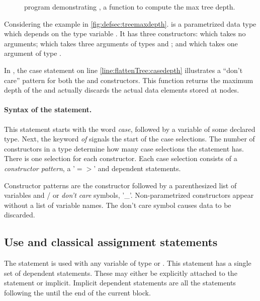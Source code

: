 \begin{figure}[htbp]
\begin{singlespace}

\end{singlespace}
\caption[Tree depth program to demonstrate ]{\lqpl{} program demonstrating , a function to compute the max tree depth.}
\label{fig:defsec:treemaxdepth}
\end{figure}

Considering the example in \vref{fig:defsec:treemaxdepth}. 
is a parametrized data type which depends on 
the type variable . It
 has three constructors:  which takes no arguments;
 which takes three arguments of types  and
; and  which takes one argument of type
.

In , the case statement on line
\ref{line:flattenTree:casedepth} illustrates a ``don't care'' pattern for
both the  and  constructors. This function
 returns the maximum depth of the  and actually
discards  the actual data elements stored at nodes.



\paragraph{Syntax of the  statement.} This statement
starts with the word \emph{case}, 
followed by a variable   of some declared type.
Next, the keyword \emph{of} signals the start of the case selections.
The number of constructors in a type determine how many 
case selections the statement has. There is one selection 
for each constructor.
Each case selection consists of  a \emph{constructor pattern}, a
'$=>$' and dependent statements. 

Constructor patterns 
are the constructor followed by a parenthesized list of 
variables and / or \emph{don't care} symbols, '\_'.  Non-parametrized 
constructors appear without a list of variable names. The 
don't care symbol causes data to be discarded.

\subsection{Use and classical assignment statements}\label{subsec:usestatements}

The  statement is used with any variable of type 
or . 
This statement  has a single 
set of dependent statements. These may 
either be explicitly attached to the  statement or implicit.
Implicit dependent statements are all the statements following
the  until the end of the current block. 

